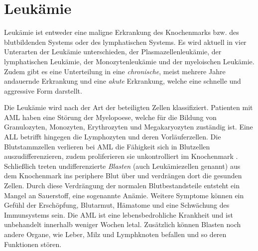 \section{Leukämie}
\label{sec:leuk}
Leukämie ist entweder eine maligne Erkrankung des Knochenmarks bzw. des blutbildenden Systems oder des lymphatischen Systems. Es wird aktuell in vier Unterarten der Leukämie unterschieden, der Plasmazellenleukämie, der lymphatischen Leukämie, der Monozytenleukämie und der myeloischen Leukämie. Zudem gibt es eine Unterteilung in eine \emph{chronische}, meist mehrere Jahre andauernde Erkrankung und eine \emph{akute} Erkrankung, welche eine schnelle und aggressive Form darstellt.

Die Leukämie wird nach der Art der beteiligten Zellen klassifiziert. Patienten mit \ac{AML} haben eine Störung der Myelopoese, welche für die Bildung von Granulozyten, Monozyten, Erythrozyten und Megakaryozyten zuständig ist. Eine \ac{ALL} betrifft hingegen die Lymphozyten und deren Vorläuferzellen. Die Blutstammzellen verlieren bei \ac{AML} die Fähigkeit sich in Blutzellen auszudifferenzieren, zudem proliferieren sie unkontrolliert im Knochenmark \cite{Papaemmanuil.2016}. Schließlich treten undifferenzierte \emph{Blasten} (auch Leukämiezellen genannt) aus dem Knochenmark ins periphere Blut über und verdrängen dort die gesunden Zellen. Durch diese Verdrängung der normalen Blutbestandsteile entsteht ein Mangel an Sauerstoff, eine sogenannte Anämie. Weitere Symptome können ein Gefühl der Erschöpfung, Blutarmut, Hämatome und eine Schwächung des Immunsystems sein. Die \ac{AML} ist eine lebensbedrohliche Krankheit und ist unbehandelt innerhalb weniger Wochen letal. Zusätzlich können Blasten noch andere Organe, wie Leber, Milz und Lymphknoten befallen und so deren Funktionen stören.

